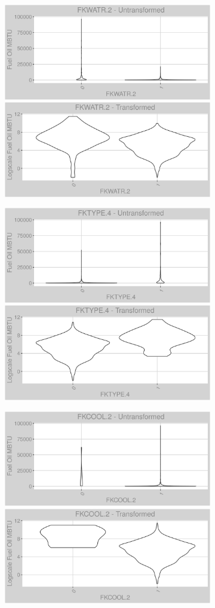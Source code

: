 \begin{figure}
\centering
\begin{subfigure}{1\textwidth}
\centering
\includegraphics[width=.49\textwidth, height=0.3\textheight]{Images/fuel_oil_var_original_0.png}
\includegraphics[width=.49\textwidth, height=0.3\textheight]{Images/fuel_oil_var_transformed_0.png}
\centering
\end{subfigure}
\begin{subfigure}{1\textwidth}
\centering
\includegraphics[width=.49\textwidth, height=0.3\textheight]{Images/fuel_oil_var_original_1.png}
\includegraphics[width=.49\textwidth, height=0.3\textheight]{Images/fuel_oil_var_transformed_1.png}
\end{subfigure}
\begin{subfigure}{1\textwidth}
\centering
\includegraphics[width=.49\textwidth, height=0.3\textheight]{Images/fuel_oil_var_original_2.png}
\includegraphics[width=.49\textwidth, height=0.3\textheight]{Images/fuel_oil_var_transformed_2.png}
\end{subfigure}
\end{figure}
